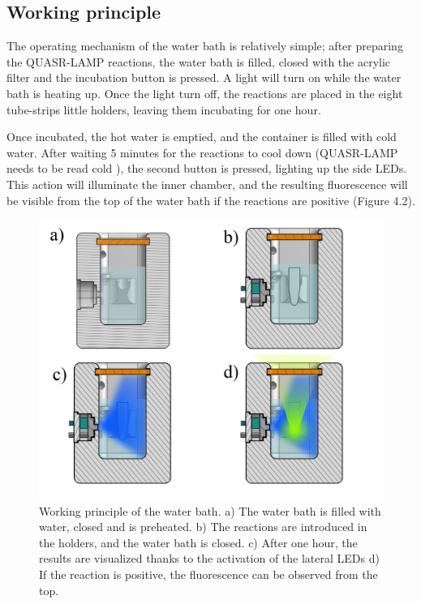 \subsection{Working principle}
The operating mechanism of the water bath is relatively simple; after preparing the QUASR-LAMP reactions, the water bath is filled, closed with the acrylic filter and the incubation button is pressed. A light will turn on while the water bath is heating up. Once the light turn off, the reactions are placed in the eight tube-strips little holders, leaving them incubating for one hour.

Once incubated, the hot water is emptied, and the container is filled with cold water. After waiting 5 minutes for the reactions to cool down (QUASR-LAMP needs to be read cold \cite{ball_quenching_2016}), the second button is pressed, lighting up the side LEDs. This action will illuminate the inner chamber, and the resulting fluorescence will be visible from the top of the water bath if the reactions are positive (Figure 4.2).

 \begin{figure}[b]
    \centering
    \includegraphics[width=1\textwidth]{figures/WorkingPrinciple.png}
    \caption{Working principle of the water bath. a) The water bath is filled with water, closed and is preheated. b) The reactions are introduced in the holders, and the water bath is closed. c) After one hour, the results are visualized thanks to the activation of the lateral LEDs d) If the reaction is positive, the fluorescence can be observed from the top.}
    \label{Working Principle Water Bath}
\end{figure}

